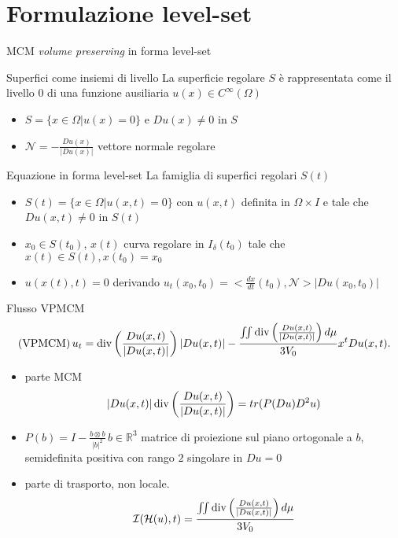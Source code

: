 \section{Formulazione level-set}
\begin{frame}{MCM \emph{volume preserving} in forma level-set}
  \begin{block}{Superfici come insiemi di livello}
    La superficie regolare $S$ è rappresentata come il livello $0$ di
    una funzione ausiliaria $u(x)\in C^{\infty}(\Omega)$
    \begin{itemize}
      \item $S=\{x\in\Omega | u(x)=0\}$ e $Du(x)\neq 0$ in $S$
      \item $\mathcal{N}=-\frac{Du(x)}{|Du(x)|}$ vettore normale
        regolare
    \end{itemize}
  \end{block}
  \begin{block}{Equazione in forma level-set}
    La famiglia di superfici regolari $S(t)$
    \begin{itemize}
      \item $S(t)=\{x\in\Omega | u(x,t)=0\}$ con $u(x,t)$ definita in
        $\Omega\times I$ e tale che $Du(x,t)\neq 0$ in $S(t)$
      \item $x_0\in S(t_0)$, $x(t)$ curva regolare in
        $I_{\delta}(t_0)$ tale che $x(t)\in S(t),x(t_0)=x_0$
      \item $u(x(t),t)=0$ derivando $u_t(x_0,t_0)=<\frac{dx}{dt}(t_0),\mathcal{N}>|Du(x_0,t_0)|$
    \end{itemize}
  \end{block}
\end{frame}

\begin{frame}{Flusso VPMCM}
    \[
      (\text{VPMCM})\,u_t=\operatorname{div}\left(\frac{Du(x,t)}{|Du(x,t)|}\right)|Du(x,t)|-\frac{\iint\operatorname{div}\left(\frac{Du(x,t)}{|Du(x,t)|}\right)d\mu}{3V_0}x^tDu(x,t). 
      \]
    \begin{itemize}
    \item parte MCM 
      \[
      |Du(x,t)|\operatorname{div}\left(\frac{Du(x,t)}{|Du(x,t)|}\right)=tr(P(Du)D^2u)
      \]
      \item $P(b)=I-\frac{b\otimes b}{|b|^2}\,b\in\mathbb{R}^3$
        matrice di proiezione sul piano ortogonale a $b$, semidefinita
        positiva con rango $2$ singolare in $Du=0$
      \item parte di trasporto, non locale. 
        \[
        \mathcal{I}(\mathcal{H}(u),t)=\frac{\iint\operatorname{div}\left(\frac{Du(x,t)}{|Du(x,t)|}\right)d\mu}{3V_0}
        \]
     \end{itemize}
\end{frame}

